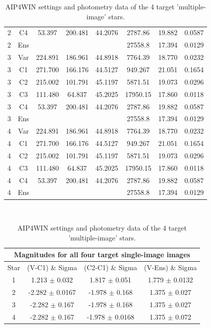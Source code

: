 \documentclass[12pt]{article}
\begin{document}
\begin{table}[H]
\begin{center}
\begin{tabular}{|c|c||c|c||c|c||c|c|}
  2& C4   &53.397  &200.481   &  44.2076  &  2787.86  & 19.882 &0.0587\\
  2&Ens                          &     & & &              27558.8  & 17.394 &0.0129\\
 \hline \hline
 3& Var & 224.891 & 186.961 &    44.8918  &  7764.39   &18.770 &0.0232 \\
 3&  C1&  271.700 & 166.176  &  44.5127   & 949.267   &21.051& 0.1654\\
  3& C2&  215.002 & 101.791  &  45.1197   & 5871.51   &19.073 &0.0296\\
  3& C3 & 111.480 &  64.837   &  45.2025   &17950.15  & 17.860& 0.0118\\
  3& C4 &  53.397 & 200.481  &   44.2076  &  2787.86 &  19.882 &0.0587\\
  3&Ens                        &  & & &                  27558.8 &  17.394& 0.0129\\
 \hline \hline
  4&Var & 224.891 & 186.961   &   44.8918   & 7764.39  & 18.770 &0.0232\\
  4&  C1  &271.700 & 166.176   &   44.5127  &  949.267 &  21.051& 0.1654\\
   4& C2  &215.002 & 101.791  &  45.1197   & 5871.51   &19.073& 0.0296\\
   4& C3  &111.480  & 64.837   &  45.2025   &17950.15  & 17.860 &0.0118\\
   4& C4  & 53.397 & 200.481   &  44.2076  &  2787.86 &  19.882& 0.0587\\
  4& Ens                     &   & & &                    27558.8  & 17.394 & 0.0129\\
 \hline 
 \end{tabular} \\[0.5cm]
 \begin{tabular}{|c||c|c|c|}
 \hline
 \multicolumn{4}{|c|}{Magnitudes for all four target single-image images} \\
 \hline 
 Star & (V-C1) \& Sigma & (C2-C1) \& Sigma & (V-Ens) \& Sigma\\
 \hline \hline
 1 & 1.213 $\pm$ 0.032 &  1.817 $\pm$ 0.051 &  1.779 $\pm$ 0.0132 \\
 \hline
 2 & -2.282 $\pm$ 0.0167 &  -1.978 $\pm$ 0.168 &  1.375 $\pm$ 0.027 \\
 \hline
 3 & -2.282 $\pm$ 0.167 &  -1.978 $\pm$ 0.168 &  1.375 $\pm$ 0.027 \\
 \hline
 4 & -2.282 $\pm$ 0.167 &  -1.978 $\pm$ 0.0168 &  1.375 $\pm$ 0.072 \\
 \hline
 \end{tabular} \\
 \caption{AIP4WIN settings and photometry data of the 4 target 'multiple-image' stars.}
 \label{MI Data}
\end{center}
\end{table} 
\end{document}
